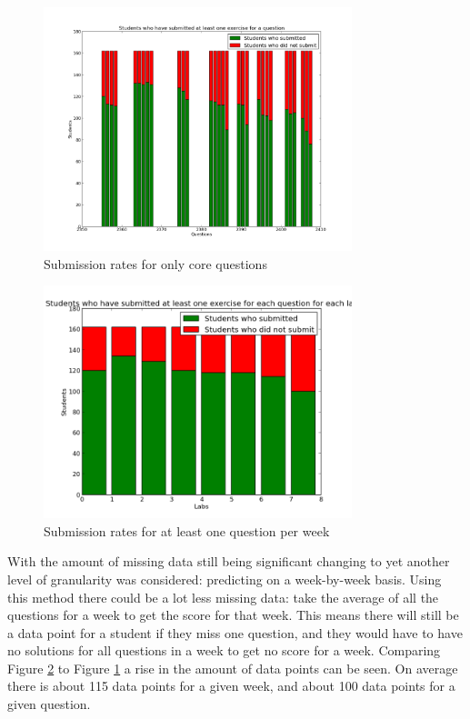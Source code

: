\begin{figure}[b!]
\centering
\includegraphics[width=0.8\textwidth]{missing_data_core.png}
\caption{Submission rates for only core questions}
\label{fig:missing_data_core}
\end{figure}

\begin{figure}[b!]
\centering
\includegraphics[width=0.8\textwidth]{missing_data_week_any.png}
\caption{Submission rates for at least one question per week}
\label{fig:missing_data_week_any}
\end{figure}

With the amount of missing data still being significant changing to yet another level of granularity was considered: predicting on a week-by-week basis. Using this method there could be a lot less missing data: take the average of all the questions for a week to get the score for that week. This means there will still be a data point for a student if they miss one question, and they would have to have no solutions for all questions in a week to get no score for a week. Comparing Figure \ref{fig:missing_data_week_any} to Figure \ref{fig:missing_data_core} a rise in the amount of data points can be seen. On average there is about 115 data points for a given week, and about 100 data points for a given question.

